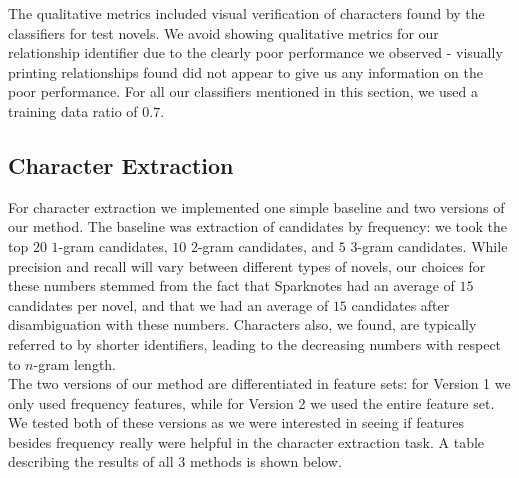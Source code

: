 \documentclass[12pt]{article}
\begin{document}
    The qualitative metrics included visual verification of characters found 
    by the classifiers for test novels. We avoid showing qualitative metrics for our 
    relationship identifier due to the clearly poor performance we observed - visually
    printing relationships found did not appear to give us any information on the poor performance. 
    For all our classifiers mentioned in this section, we used a training data ratio of $0.7$. 

    \subsection{Character Extraction}
        
        For character extraction we implemented one simple baseline and two versions of our method.
        The baseline was extraction of candidates by frequency: we took the top $20$ $1$-gram candidates,
        $10$ $2$-gram candidates, and $5$ $3$-gram candidates. While precision and recall will vary
        between different types of novels, our choices for these numbers stemmed
        from the fact that Sparknotes had an average of $15$ candidates per novel, and that we had an average of
        $15$ candidates after disambiguation with these numbers. Characters also, we found, are typically
        referred to by shorter identifiers, leading to the decreasing numbers with respect to $n$-gram length. \\

        The two versions of our method are differentiated in feature sets: for Version 1 we only used
        frequency features, while for Version 2 we used the entire feature set. We tested both of these versions
        as we were interested in seeing if features besides frequency really were helpful in the character
        extraction task. A table describing the results of all $3$ methods is shown below. 
\end{document}
